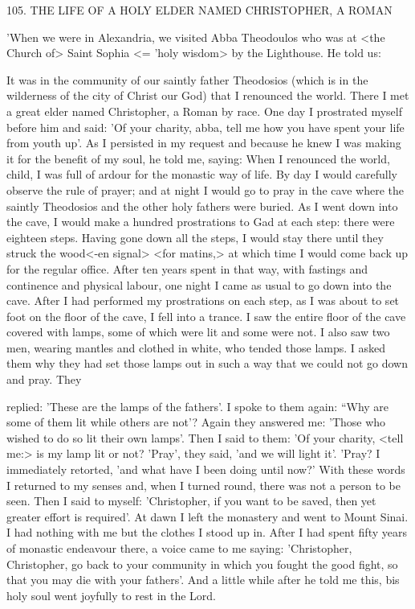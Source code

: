 105.
THE LIFE OF A HOLY ELDER NAMED
CHRISTOPHER, A ROMAN

'When we were in Alexandria, we visited Abba Theodoulos who was
at <the Church of> Saint Sophia <= 'holy wisdom\textquotesingle > by the
Lighthouse.
He told us:

It was in the community of our saintly father Theodosios (which is
in the wilderness of the city of Christ our God) that I renounced the
world.
There I met a great elder named Christopher, a Roman by
race.
One day I prostrated myself before him and said: 'Of your
charity, abba, tell me how you have spent your life from youth up'.
As I persisted in my request and because he knew I was making it
for the benefit of my soul, he told me, saying: When I renounced
the world, child, I was full of ardour for the monastic way of life.
By day I would carefully observe the rule of prayer; and at night I
would go to pray in the cave where the saintly Theodosios and the
other holy fathers were buried.
As I went down into the cave, I
would make a hundred prostrations to Gad at each step: there were
eighteen steps.
Having gone down all the steps, I would stay there
until they struck the wood<-en signal> <for matins,> at which time
I would come back up for the regular office.
After ten years spent
in that way, with fastings and continence and physical labour, one
night I came as usual to go down into the cave.
After I had
performed my prostrations on each step, as I was about to set foot
on the floor of the cave, I fell into a trance.
I saw the entire floor
of the cave covered with lamps, some of which were lit and some
were not.
I also saw two men, wearing mantles and clothed in white,
who tended those lamps.
I asked them why they had set those lamps
out in such a way that we could not go down and pray.
They

replied: 'These are the lamps of the fathers'.
I spoke to them again:
“Why are some of them lit while others are not'? Again they
answered me: 'Those who wished to do so lit their own lamps'.
Then I said to them: 'Of your charity, <tell me:> is my lamp lit or
not? 'Pray', they said, 'and we will light it'.
'Pray? I immediately
retorted, 'and what have I been doing until now?' With these words
I returned to my senses and, when I turned round, there was not a
person to be seen.
Then I said to myself: 'Christopher, if you want
to be saved, then yet greater effort is required'.
At dawn I left the
monastery and went to Mount Sinai.
I had nothing with me but the
clothes I stood up in.
After I had spent fifty years of monastic
endeavour there, a voice came to me saying: 'Christopher,
Christopher, go back to your community in which you fought the
good fight, so that you may die with your fathers'.
And a little
while after he told me this, bis holy soul went joyfully to rest in the
Lord.

